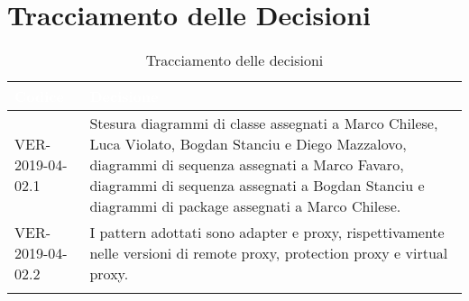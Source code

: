 \newpage
\section{Tracciamento delle Decisioni}

\begin{longtable}{|C{.40\textwidth}|C{.60\textwidth}|}
\hline
{}\textbf{\textcolor{white}{Codice}} & \textbf{\textcolor{white}{Decisione}}\\
\hline
VER-2019-04-02.1 & Stesura diagrammi di classe assegnati a Marco Chilese, Luca Violato, Bogdan Stanciu e Diego Mazzalovo, diagrammi di sequenza assegnati a Marco Favaro, diagrammi di sequenza assegnati a Bogdan Stanciu e diagrammi di package assegnati a Marco Chilese. \\
\hline
{}VER-2019-04-02.2 & I pattern adottati sono adapter e proxy, rispettivamente nelle versioni di remote proxy, protection proxy e virtual proxy. \\
\hline

\caption{Tracciamento delle decisioni}
\end{longtable}
